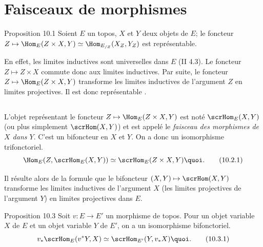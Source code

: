 \documentclass[10pt]{../fichiers-configuration-latex/smfart}
\begin{document}
\section{Faisceaux de morphismes}\pageoriginale

\begin{enonce*}{Proposition 10.1}
Soient $E$ un topos, $X$ et $Y$ deux objets de $E$; le foncteur
$Z\mapsto \Hom_E(Z\times X,Y)\simeq \Hom_{E_{/Z}}(X_Z, Y_Z)$ est
représentable.
\end{enonce*}

En effet, les limites inductives sont universelles dans $E$ (II
4.3). Le foncteur $Z\mapsto Z\times X$ commute donc aux limites
inductives. Par suite, le foncteur $Z\mapsto \Hom_E(Z\times X,Y)$
transforme les limites inductives de l'argument $Z$ en limites
projectives. Il est donc représentable .

\setcounter{subsection}{1}
\subsection{}
L'objet représentant le foncteur $Z\mapsto \Hom_{E}(Z\times X, Y)$
est noté $\scrHom_{E}(X,Y)$ (ou plus simplement $\scrHom(X,Y)$) et
est appelé le \emph{faisceau des morphismes de $X$ dans $Y$}. C'est
un bifoncteur en $X$ et $Y$. On a donc un isomorphisme
trifonctoriel.
\begin{equation*}
\Hom_E(Z,\scrHom_E(X,Y))\simeq \scrHom_E(Z\times X,
Y){\quoi}.\tag{10.2.1}
\end{equation*}

Il résulte alors de la formule  que le bifoncteur
$(X,Y)\mapsto \scrHom(X,Y)$ transforme les limites inductives de
l'argument $X$ (\resp les limites projectives de l'argument $Y$) en
limites projectives dans $E$.

\begin{enonce*}{Proposition 10.3}
Soit $v:E\rightarrow E'$ un morphisme de topos. Pour un objet
variable $X$ de $E$ et un objet variable $Y$ de $E'$, on a un
isomorphisme bifonctoriel.
\begin{equation*}
v_{\ast}\scrHom_E(v^{\ast}Y,X)\simeq
\scrHom_{E'}(Y,v_{\ast}X){\quoi}.\tag{10.3.1}
\end{equation*}
\end{enonce*}
\end{document}

